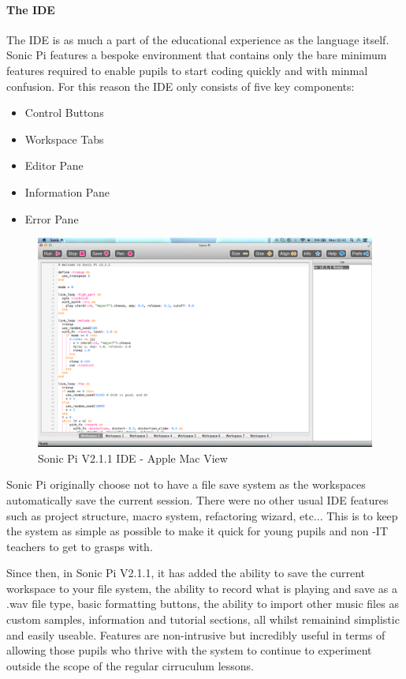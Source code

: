 \documentclass[11pt]{scrartcl}
\begin{document}
\paragraph{The IDE}
The IDE is as much a part of the educational experience as the language 
itself. Sonic Pi features a bespoke environment that contains only the bare 
minimum features required to enable pupils to start coding quickly and with 
minmal confusion. For this reason the IDE only consists of five key components:

\begin{itemize}
	\item Control Buttons
	\item Workspace Tabs
	\item Editor Pane
	\item Information Pane
	\item Error Pane
\end{itemize}

\begin{figure}[ht]
	\centering
	\includegraphics[width=\textwidth]{images/sonic-ide.png}
	\caption{Sonic Pi V2.1.1 IDE - Apple Mac View}
\end{figure}

Sonic Pi originally choose not to have a file save system as the workspaces 
automatically save the current session. There were no other usual IDE features 
such as project structure, macro system, refactoring wizard, etc... This is to 
keep the system as simple as possible to make it quick for young pupils and non
-IT teachers to get to grasps with.

Since then, in Sonic Pi V2.1.1, it has added the ability to save the current 
workspace to your file system, the ability to record what is playing and save 
as a .wav file type, basic formatting buttons, the ability to import other 
music files as custom samples, information and tutorial sections, all whilst 
remainind simplistic and easily useable. Features are non-intrusive but 
incredibly useful in terms of allowing those pupils who thrive with the system 
to continue to experiment outside the scope of the regular cirruculum lessons.
\end{document}
